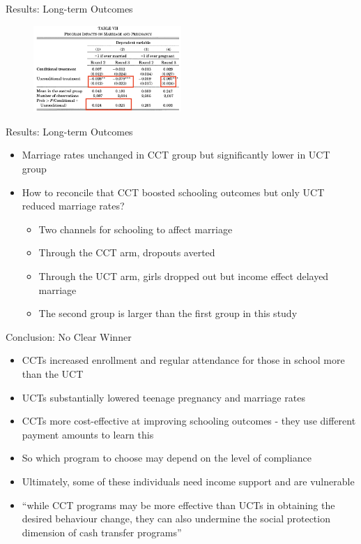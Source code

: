 \documentclass[11pt,notes=hide,aspectratio=169,mathserif]{beamer}
\begin{document}
\begin{frame}{Results: Long-term Outcomes}
\begin{figure}
\centering
\includegraphics[width=0.5\textwidth]{inputs/table10.png}
\end{figure}
\end{frame}
\begin{frame}{Results: Long-term Outcomes}
\begin{itemize}
    \item Marriage rates unchanged in CCT group but significantly lower in UCT group
    \pause \item How to reconcile that CCT boosted schooling outcomes but only UCT reduced marriage rates?
    \begin{itemize}
        \pause \item Two channels for schooling to affect marriage 
        \pause \item Through the CCT arm, dropouts averted 
        \pause \item Through the UCT arm, girls dropped out but income effect delayed marriage 
        \pause \item The second group is larger than the first group in this study 
    \end{itemize}
\end{itemize}
\end{frame}

\begin{frame}{Conclusion: No Clear Winner}
\begin{itemize}
\item CCTs increased enrollment and regular attendance for those in school more than the UCT
\pause \item UCTs substantially lowered teenage pregnancy and marriage rates 
\pause \item CCTs more cost-effective at improving schooling outcomes - they use different payment amounts to learn this 
\pause \item So which program to choose may depend on the level of compliance 
\pause \item Ultimately, some of these individuals need income support and are vulnerable
\pause \item ``while CCT programs may be more effective than UCTs in obtaining the desired behaviour change, they can also undermine the social protection dimension of cash transfer programs''
\end{itemize}
\end{frame}
\end{document}
